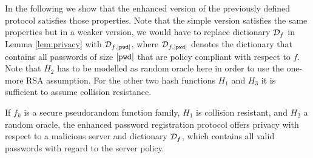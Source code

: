 
In the following we show that the enhanced version of the previously defined protocol satisfies those properties.
Note that the simple version satisfies the same properties but in a weaker version, \ie we would have to replace dictionary $\mathcal{D}_f$ in Lemma \ref{lem:privacy} with $\mathcal{D}_{f,|\mathtt{pwd}|}$, where $\mathcal{D}_{f,|\mathtt{pwd}|}$ denotes the dictionary that contains all passwords of size $|\mathtt{pwd}|$ that are policy compliant with respect to $f$.
Note that $H_2$ has to be modelled as random oracle here in order to use the one-more RSA assumption.
For the other two hash functions $H_1$ and $H_3$ it is sufficient to assume collision resistance.

\begin{lemma}[Privacy]\label{lem:privacy}
If $f_k$ is a secure pseudorandom function family, $H_1$ is collision resistant, and $H_2$ a random oracle, the enhanced password registration protocol offers privacy with respect to a malicious server and dictionary $\mathcal{D}_f$, which contains all valid passwords with regard to the server policy.
\end{lemma}

